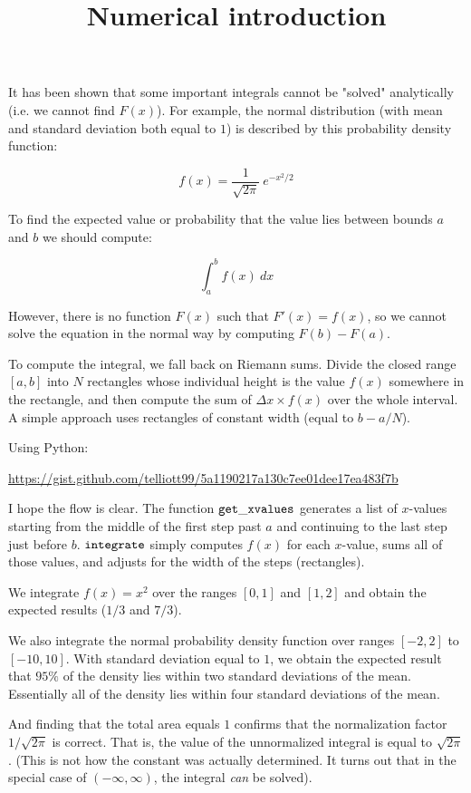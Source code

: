 \documentclass[11pt, oneside]{article}
\title{Numerical introduction}
\date{}
\begin{document}
\maketitle
\Large

It has been shown that some important integrals cannot be "solved" analytically (i.e.  we cannot find $F(x)$).  For example, the normal distribution (with mean and standard deviation both equal to $1$) is described by this probability density function:

\[ f(x) = \frac{1}{\sqrt{2 \pi}} \ e^{-x^2/2} \]

To find the expected value or probability that the value lies between bounds $a$ and $b$ we should compute:

\[  \int_a^b f(x) \ dx \]

However, there is no function $F(x)$ such that $F'(x) = f(x)$, so we cannot solve the equation in the normal way by computing $F(b) - F(a)$.

To compute the integral, we fall back on Riemann sums.  Divide the closed range $[a,b]$ into $N$ rectangles whose individual height is the value $f(x)$ somewhere in the rectangle, and then compute the sum of $\Delta x \times f(x)$ over the whole interval.  A simple approach uses rectangles of constant width (equal to $b-a/N$).

Using Python:

\url{https://gist.github.com/telliott99/5a1190217a130c7ee01dee17ea483f7b}

I hope the flow is clear.  The function $\tt{get\_xvalues}$ generates a list of $x$-values starting from the middle of the first step past $a$ and continuing to the last step just before $b$.  $\tt{integrate}$ simply computes $f(x)$ for each $x$-value, sums all of those values, and adjusts for the width of the steps (rectangles).

We integrate $f(x) = x^2$ over the ranges $[0,1]$ and $[1,2]$ and obtain the expected results ($1/3$ and $7/3$).

We also integrate the normal probability density function over ranges $[-2,2]$ to $[-10,10]$.  With standard deviation equal to $1$, we obtain the expected result that $95 \%$ of the density lies within two standard deviations of the mean.  Essentially all of the density lies within four standard deviations of the mean.

And finding that the total area equals $1$ confirms that the normalization factor $1/\sqrt{2 \pi}$ is correct.  That is, the value of the unnormalized integral is equal to $\sqrt{2 \pi}$.  (This is not how the constant was actually determined.  It turns out that in the special case of $(-\infty,\infty)$, the integral \emph{can} be solved).
\end{document}
